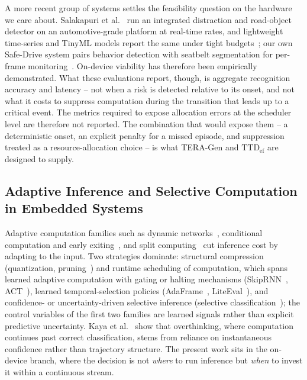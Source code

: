 \documentclass[a4paper,fleqn]{cas-dc}
\newcommand{\TERAGen}{\mbox{TERA-Gen}\xspace}
\begin{document}
A more recent group of systems settles the feasibility question on the hardware we
care about. Salakapuri et al.~\cite{salakapuri2025integrated} run an integrated
distraction and road-object detector on an automotive-grade platform at real-time
rates, and lightweight time-series and TinyML models report the same under tight
budgets~\cite{fresta2025cognitive,tinydl2025driverstate}; our own Safe-Drive system
pairs behavior detection with seatbelt segmentation for per-frame
monitoring~\cite{albarello2025safedrive}. On-device viability has therefore been empirically demonstrated. What these evaluations report, though, is aggregate recognition accuracy and
latency -- not when a risk is detected relative to its onset, and not what it costs
to suppress computation during the transition that leads up to a critical event. The metrics required to expose allocation errors at the scheduler level are therefore not reported. The combination that would expose them -- a deterministic onset, an explicit
penalty for a missed episode, and suppression treated as a resource-allocation
choice -- is what \TERAGen and $\mathrm{TTD}_{\mathrm{ef}}$ are designed to supply.
\subsection{Adaptive Inference and Selective Computation in Embedded Systems}
\label{sec:rel_edgeai}
Adaptive computation families such as dynamic networks~\cite{han2022dynamic,montello2025dynamic}, conditional computation and early exiting~\cite{scardapane2024conditional,rahmath2024earlyexit,teerapittayanon2016branchynet,laskaridis2021adaptive}, and split computing~\cite{matsubara2022split,laskaridis2020hapi} cut inference cost by adapting to the input. Two strategies dominate: structural compression (quantization, pruning~\cite{hariharan2023driveredge}) and runtime scheduling of computation{\color{\revcolor}, which spans learned adaptive computation with gating or halting mechanisms (SkipRNN~\cite{campos2018skip}, ACT~\cite{graves2016adaptive}), learned temporal-selection policies (AdaFrame~\cite{wu2019adaframe}, LiteEval~\cite{wu2019liteeval}), and confidence- or uncertainty-driven selective inference (selective classification~\cite{geifman2017selective}); the control variables of the first two families are learned signals rather than explicit predictive uncertainty}. Kaya et al.~\cite{kaya2019shallow} show that overthinking, where computation continues past correct classification, stems from reliance on instantaneous confidence rather than trajectory structure. The present work sits in the on-device branch, where the decision is not \emph{where} to run inference but \emph{when} to invest it within a continuous stream.
\end{document}
